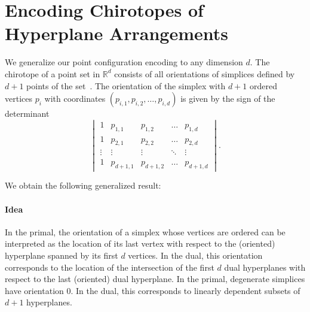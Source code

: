 \section{Encoding Chirotopes of Hyperplane Arrangements}\label{sec:hyperplanes}



We generalize our point configuration encoding to any dimension \(d\). The
chirotope of a point set in \(\mathbb{R}^d\) consists of all orientations of
simplices defined by \(d+1\) points of the set~\cite{RZ04}.
The orientation of the simplex with \(d+1\) ordered vertices \(p_i\) with
coordinates \((p_{i,1} , p_{i,2} , \ldots, p_{i,d} )\) is given by the sign of
the determinant
%
\begin{displaymath}
  \begin{vmatrix}
    1 & p_{1,1} & p_{1,2} & \hdots & p_{1,d} \\
    1 & p_{2,1} & p_{2,2} & \hdots & p_{2,d} \\
    \vdots & \vdots & \vdots & \ddots & \vdots \\
    1 & p_{d+1,1} & p_{d+1,2} & \hdots & p_{d+1,d}
  \end{vmatrix}.
\end{displaymath}

We obtain the following generalized result:
%



\paragraph*{Idea}

In the primal, the orientation of a simplex whose vertices are ordered can be
interpreted as the location of its last vertex with respect to the (oriented)
hyperplane spanned by its first \(d\) vertices. In the dual, this orientation
corresponds to the location of the intersection of the first \(d\) dual
hyperplanes with respect to the last (oriented) dual hyperplane.
%
\ifjournal%
  In the primal, degenerate simplices have orientation \(0\). In the dual, this
  corresponds to linearly dependent subsets of \(d+1\) hyperplanes.
\fi%

